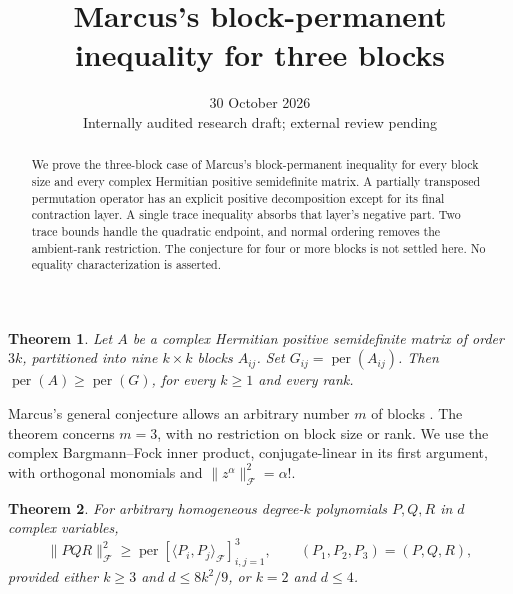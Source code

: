 \documentclass[11pt]{article}
\title{Marcus's block-permanent inequality for three blocks}
\author{}
\date{30 October 2026\\[3pt]\small Internally audited research draft; external review pending}
\newtheorem{theorem}{Theorem}
\newcommand{\per}{\operatorname{per}}
\newcommand{\Fock}{\mathcal F}
\begin{document}
\maketitle
\begin{abstract}
We prove the three-block case of Marcus's block-permanent inequality for every block size and every complex Hermitian positive semidefinite matrix. A partially transposed permutation operator has an explicit positive decomposition except for its final contraction layer. A single trace inequality absorbs that layer's negative part. Two trace bounds handle the quadratic endpoint, and normal ordering removes the ambient-rank restriction. The conjecture for four or more blocks is not settled here. No equality characterization is asserted.
\end{abstract}
\begin{theorem}\label{main}
Let \(A\) be a complex Hermitian positive semidefinite matrix of order \(3k\), partitioned into nine \(k\times k\) blocks \(A_{ij}\). Set \(G_{ij}=\per(A_{ij})\). Then \(\per(A)\ge\per(G)\), for every \(k\ge1\) and every rank.
\end{theorem}
Marcus's general conjecture allows an arbitrary number \(m\) of blocks \cite{wanless,zhang}. The theorem concerns \(m=3\), with no restriction on block size or rank. We use the complex Bargmann--Fock inner product, conjugate-linear in its first argument, with orthogonal monomials and \(\|z^\alpha\|_{\Fock}^2=\alpha!\).
\begin{theorem}\label{poly}
For arbitrary homogeneous degree-\(k\) polynomials \(P,Q,R\) in \(d\) complex variables,
\[
 \|PQR\|_{\Fock}^2\ge
 \per[\langle P_i,P_j\rangle_{\Fock}]_{i,j=1}^3,
 \qquad(P_1,P_2,P_3)=(P,Q,R),
\]
provided either \(k\ge3\) and \(d\le8k^2/9\), or \(k=2\) and \(d\le4\).
\end{theorem}
\end{document}
